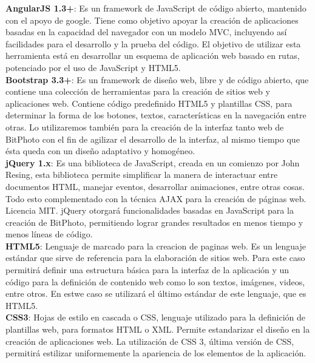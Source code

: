 \documentclass{memoria}
\begin{document}

\textbf{AngularJS 1.3+}: Es un framework de JavaScript de código abierto, mantenido con el apoyo de google. Tiene como objetivo apoyar la creación de aplicaciones basadas en la capacidad del navegador con un modelo MVC, incluyendo así facilidades para el desarrollo y la prueba del código. El objetivo de utilizar esta herramienta está en desarrollar un esquema de aplicación web basado en rutas, potenciado por el uso de JavaScript y HTML5.\\

\textbf{Bootstrap 3.3+}: Es un framework de diseño web, libre y de código abierto, que contiene una colección de herramientas para la creación de sitios web y aplicaciones web. Contiene código predefinido HTML5 y plantillas CSS, para determinar la forma de los botones, textos, características en la navegación entre otras. Lo utilizaremos también para la creación de la interfaz tanto web de BitPhoto con el fin de agilizar el desarrollo de la interfaz, al mismo tiempo que ésta queda con un diseño adaptativo y homogéneo.\\

\textbf{jQuery 1.x}: Es una biblioteca de JavaScript, creada en un comienzo por John Resing, esta biblioteca permite simplificar la manera de interactuar entre documentos HTML, manejar eventos, desarrollar animaciones, entre otras cosas. Todo esto complementado con la técnica AJAX para la creación de páginas web. Licencia MIT. jQuery otorgará funcionalidades basadas en JavaScript para la creación de BitPhoto, permitiendo lograr grandes resultados en menos tiempo y menos líneas de código.\\

\textbf{HTML5}: Lenguaje de marcado para la creacion de paginas web. Es un lenguaje estándar que sirve de referencia para la elaboración de sitios web. Para este caso permitirá definir una estructura básica para la interfaz de la aplicación y un código para la definición de contenido web como lo son textos, imágenes, videos, entre otros. En estwe caso se utilizará el último estándar de este lenguaje, que es HTML5.\\

\textbf{CSS3}: Hojas de estilo en cascada o CSS, lenguaje utilizado para la definición de plantillas web, para formatos HTML o XML. Permite estandarizar el diseño en la creación de aplicaciones web. La utilización de CSS 3, última versión de CSS, permitirá estilizar uniformemente la apariencia de los elementos de la aplicación.\\
\end{document}
